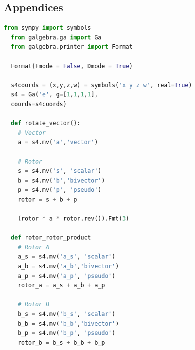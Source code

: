 \documentclass{l4proj}
\begin{document}
\begin{appendices}

\chapter{Appendices}


\begin{lstlisting}[language=python, caption={
  Rotor4 product derivation using Geometric Algebra in python: \\
  Rotor4-Vector rotation using double reflection; producing \cref{eq:rotate_vec}.\\
  Rotor4-Rotor4 product to apply a 4D Rotor to another 4D Rotor; producing \cref{eq:rotate_rotor}.
  }, label=lst:rotor_derivation]
  from sympy import symbols
  from galgebra.ga import Ga
  from galgebra.printer import Format
  
  Format(Fmode = False, Dmode = True)
  
  s4coords = (x,y,z,w) = symbols('x y z w', real=True)
  s4 = Ga('e', g=[1,1,1,1],
  coords=s4coords)
  
  def rotate_vector():
    # Vector
    a = s4.mv('a','vector')

    # Rotor
    s = s4.mv('s', 'scalar')
    b = s4.mv('b','bivector')
    p = s4.mv('p', 'pseudo')
    rotor = s + b + p
  
    (rotor * a * rotor.rev()).Fmt(3)
  
  def rotor_rotor_product
    # Rotor A
    a_s = s4.mv('a_s', 'scalar')
    a_b = s4.mv('a_b','bivector')
    a_p = s4.mv('a_p', 'pseudo')
    rotor_a = a_s + a_b + a_p
  
    # Rotor B
    b_s = s4.mv('b_s', 'scalar')
    b_b = s4.mv('b_b','bivector')
    b_p = s4.mv('b_p', 'pseudo')
    rotor_b = b_s + b_b + b_p
  

\end{lstlisting}
\end{appendices}
\end{document}
